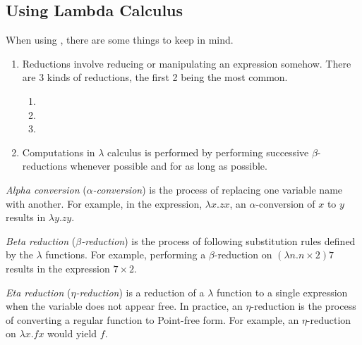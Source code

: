 \subsection{Using Lambda Calculus}\label{subsec:Using_Lambda_Calculus}
When using , there are some things to keep in mind.
\begin{enumerate}[noitemsep]
\item Reductions involve reducing or manipulating an expression somehow.
  There are 3 kinds of reductions, the first 2 being the most common.
  \begin{enumerate}[noitemsep]
  \item {}
  \item {}
  \item {}
  \end{enumerate}
\item Computations in $\lambda$ calculus is performed by performing successive $\beta$-reductions whenever possible and for as long as possible.
\end{enumerate}

\begin{definition}\label{def:Alpha_Conversion}
  \emph{Alpha conversion} (\emph{$\alpha$-conversion}) is the process of replacing one variable name with another.
  For example, in the expression, $\lambda x. zx$, an $\alpha$-conversion of $x$ to $y$ results in $\lambda y. zy$.
\end{definition}

\begin{definition}\label{def:Beta_Reduction}
  \emph{Beta reduction} (\emph{$\beta$-reduction}) is the process of following substitution rules defined by the $\lambda$ functions.
  For example, performing a $\beta$-reduction on $(\lambda n. n \times 2) 7$ results in the expression $7 \times 2$.
\end{definition}

\begin{definition}\label{def:Eta_Reduction}
  \emph{Eta reduction} (\emph{$\eta$-reduction}) is a reduction of a $\lambda$ function to a single expression when the variable does not appear free.
  In practice, an $\eta$-reduction is the process of converting a regular function to Point-free form.
  For example, an $\eta$-reduction on $\lambda x. f x$ would yield $f$.
\end{definition}


